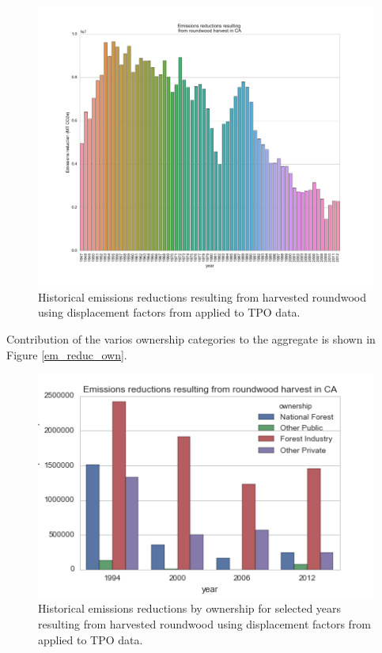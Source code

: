 \documentclass[a4paper]{article}
\begin{document}
\begin{figure}[htb]
\centering
\includegraphics[width=\textwidth]{./graphics/ann_hh_em_reduc.pdf}
\caption{Historical emissions reductions resulting from harvested roundwood using displacement factors from \citep{Sathre2010} applied to TPO data.}
\end{figure}

Contribution of the varios ownership categories to the aggregate is
shown in Figure \ref{em_reduc_own}.

\begin{figure}[htb]
\centering
\includegraphics[width=.9\linewidth]{./graphics/harv_em_reductions.png}
\caption{\label{fig:orgparagraph1}
Historical emissions reductions by ownership for selected years resulting from harvested roundwood using displacement factors from \citep{Sathre2010} applied to TPO data.}
\end{figure}
\end{document}
